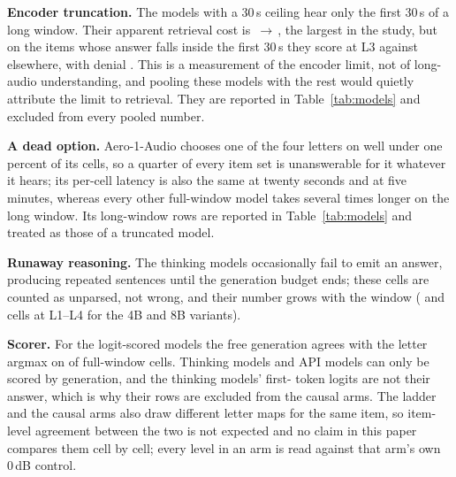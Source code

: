 \documentclass{article}
\begin{document}
\textbf{Encoder truncation.} The \Ntrunc{} models with a 30\,s ceiling
hear only the first 30\,s of a long window. Their apparent retrieval cost is
\truncCorrOne{}\,$\rightarrow$\,\truncCorrThree{}, the largest in the study,
but on the items whose answer falls inside the first 30\,s they score
\truncInsideCorr{} at L3 against \truncOutsideCorr{} elsewhere, with denial
\truncOutsideDen{}. This is a measurement of the encoder limit, not of
long-audio understanding, and pooling these models with the rest would
quietly attribute the limit to retrieval. They are reported in
Table~\ref{tab:models} and excluded from every pooled number.

\textbf{A dead option.} Aero-1-Audio chooses one of the four letters on
well under one percent of its cells, so a quarter of every item set is
unanswerable for it whatever it hears; its per-cell latency is also the same
at twenty seconds and at five minutes, whereas every other full-window model
takes several times longer on the long window. Its long-window rows are
reported in Table~\ref{tab:models} and treated as those of a truncated
model.

\textbf{Runaway reasoning.} The thinking models occasionally fail to emit
an answer, producing repeated sentences until the generation budget ends;
these cells are counted as unparsed, not wrong, and their number grows with
the window (\unparsedThinkFourb{} and \unparsedThinkEightb{} cells at
L1--L4 for the 4B and 8B variants).

\textbf{Scorer.} For the logit-scored models the free generation agrees with
the letter argmax on \scorerAgree{} of full-window cells. Thinking models and
API models can only be scored by generation, and the thinking models' first-
token logits are not their answer, which is why their rows are excluded from
the causal arms. The ladder and the causal arms also draw different letter
maps for the same item, so item-level agreement between the two is not
expected and no claim in this paper compares them cell by cell; every level
in an arm is read against that arm's own 0\,dB control.
\end{document}
